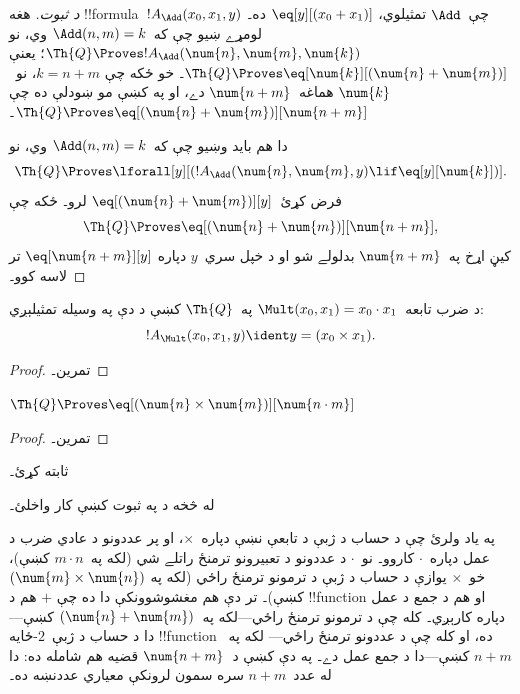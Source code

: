 \documentclass[../../../include/open-logic-section]{subfiles}
\begin{document}
\begin{proof}[د  ثبوت]
هغه !!{formula}~$!A_\Add(x_0, x_1, y)$ چې~$\Add$ تمثيلوي،
$\eq[y][(x_0 + x_1)]$ ده۔ لومړے ښيو چې که~$\Add(n, m) = k$ وي،
نو $\Th{Q} \Proves !A_\Add(\num{n}, \num{m}, \num{k})$؛ يعنې
$\Th{Q} \Proves \eq[\num{k}][(\num{n} + \num{m})]$۔ خو ځکه چې
$k = n + m$، نو~$\num{k}$ هماغه~$\num{n+m}$ دے، او په
 کښې مو ښودلې ده چې
$\Th{Q} \Proves \eq[(\num{n} + \num{m})][\num{n+m}]$۔

دا هم بايد وښيو چې که~$\Add(n, m) = k$ وي، نو
\[
\Th{Q} \Proves \lforall[y][(!A_\Add(\num{n}, \num{m}, y) \lif
  \eq[y][\num{k}])].
\]
فرض کړئ~$\eq[(\num{n} + \num{m})][y]$ لرو۔ ځکه چې
\[
\Th{Q} \Proves \eq[(\num{n}+\num{m})][\num{n+m}],
\]
کيڼ اړخ په~$\num{n+m}$ بدلولے شو او د خپل سري~$y$ دپاره
$\eq[\num{n+m}][y]$ تر لاسه کوو۔
\end{proof}

\begin{prop}
د ضرب تابعه~$\Mult(x_0, x_1) = x_0 \cdot x_1$ په~$\Th{Q}$ کښې د
دې په وسيله تمثيلېږي:
\[
  !A_{\Mult}(x_0, x_1, y) \ident y = (x_0 \times x_1).
\]
\end{prop}

\begin{proof} تمرین۔ \end{proof}

\begin{lem}
$\Th{Q} \Proves \eq[(\num{n} \times \num{m})][\num{n \cdot m}]$
\end{lem}

\begin{proof} تمرین۔ \end{proof}

\begin{prob}
 ثابته کړئ۔
\end{prob}

\begin{prob}
له  څخه د
 په ثبوت کښې کار واخلئ۔
\end{prob}

\begin{explain}
  په ياد ولرئ چې د حساب د ژبې د تابعې نښې دپاره~$\times$، او پر
  عددونو د عادي ضرب د عمل دپاره~$\cdot$ کاروو۔ نو~$\cdot$ د عددونو
  د تعبيرونو ترمنځ راتلے شي (لکه په~$m \cdot n$ کښې)، خو~$\times$
  يوازې د حساب د ژبې د ترمونو ترمنځ راځي (لکه په
  $(\num{m} \times \num{n})$ کښې)۔ تر دې هم مغشوشوونکې دا ده چې
  $+$ هم د !!{function} او هم د جمع د عمل دپاره کارېږي۔ کله چې د
  ترمونو ترمنځ راځي---لکه په~$(\num{n} + \num{m})$ کښې---دا د حساب
  د ژبې~$2$-ځايه !!{function} ده، او کله چې د عددونو ترمنځ راځي---
  لکه په~$n+m$ کښې---دا د جمع عمل دے۔ په دې کښې د~$\num{n+m}$
  قضيه هم شامله ده: دا له عدد~$n+m$ سره سمون لرونکې معياري عددنښه
  ده۔
\end{explain}
\end{document}
